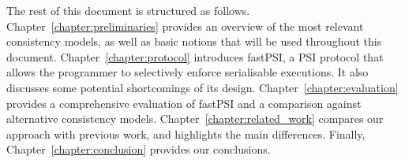 
The rest of this document is structured as follows. Chapter~\ref{chapter:preliminaries} provides an overview of the most relevant consistency models, as well as basic notions that will be used throughout this document. Chapter~\ref{chapter:protocol} introduces fastPSI, a PSI protocol that allows the programmer to selectively enforce serialisable executions. It also discusses some potential shortcomings of its design. Chapter~\ref{chapter:evaluation} provides a comprehensive evaluation of fastPSI and a comparison against alternative consistency models. Chapter~\ref{chapter:related_work} compares our approach with previous work, and highlights the main differences. Finally, Chapter~\ref{chapter:conclusion} provides our conclusions.
